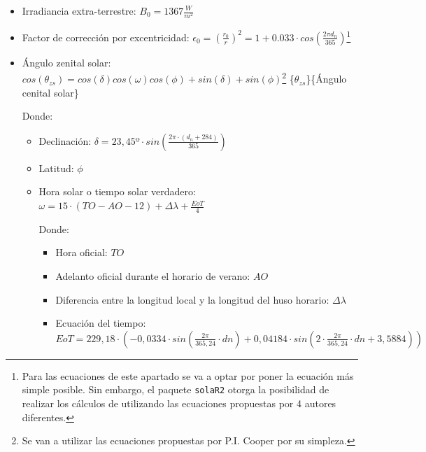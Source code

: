 \begin{itemize}
\item Irradiancia extra-terrestre: \(B_0=1367\frac{W}{m^2}\) 
\item Factor de corrección por excentricidad: \(\epsilon_0=(\frac{r_0}{r})^2=1+0.033\cdot cos(\frac{2\pi d_n}{365})\)\footnote{Para las ecuaciones de este apartado se va a optar por poner la ecuación más simple posible. Sin embargo, el paquete \texttt{solaR2} otorga la posibilidad de realizar los cálculos de utilizando las ecuaciones propuestas por 4 autores diferentes.} 
\item Ángulo zenital solar: \(cos(\theta_{zs})=cos(\delta)cos(\omega)cos(\phi)+sin(\delta)+sin(\phi)\)\footnote{Se van a utilizar las ecuaciones propuestas por P.I. Cooper \cite{Cooper1969} por su simpleza.} \nomenclature[thetazs]\{\(\theta_{zs}\)\}\{Ángulo cenital solar\}

Donde:
\begin{itemize}
\item Declinación: \(\delta =23,45º\cdot sin(\frac{2\pi \cdot (d_n+284)}{365})\) 
\item Latitud: \(\phi\) 
\item Hora solar o tiempo solar verdadero: \(\omega = 15\cdot (TO-AO-12)+\Delta \lambda +\frac{EoT}{4}\) 

Donde:
\begin{itemize}
\item Hora oficial: \(TO\) 
\item Adelanto oficial durante el horario de verano: \(AO\) 
\item Diferencia entre la longitud local y la longitud del huso horario: \(\Delta \lambda\) 
\item Ecuación del tiempo: \(EoT=229,18\cdot (-0,0334\cdot sin(\frac{2\pi}{365,24}\cdot dn)+0,04184\cdot sin(2\cdot \frac{2\pi}{365,24}\cdot dn+3,5884))\) 
\end{itemize}
\end{itemize}
\end{itemize}

